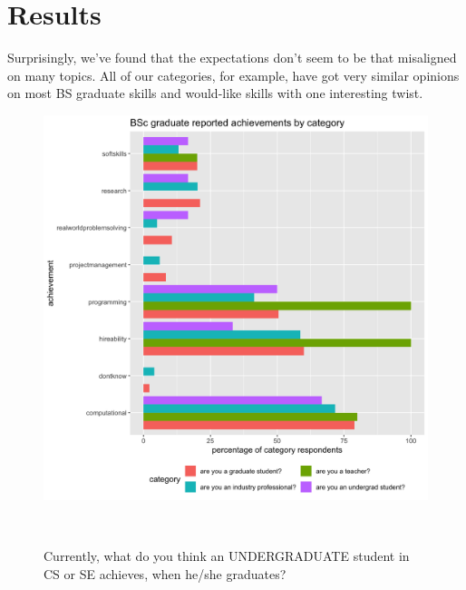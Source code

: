 \documentclass{sigchi}
\begin{document}
\section{Results}
Surprisingly, we've found that the expectations don't seem to be that misaligned on many topics. All of our categories, for example, have got very similar opinions on most BS graduate skills and would-like skills with one interesting twist.

\begin{figure}
 \includegraphics[scale=0.2]{../data-analysis/plots_output/BSc_graduate_reported_achievements_by_category.png}
 \caption{Currently, what do you think an UNDERGRADUATE student in CS or SE achieves, when he/she graduates?}~\label{fig:figure1}
\end{figure}
\end{document}
